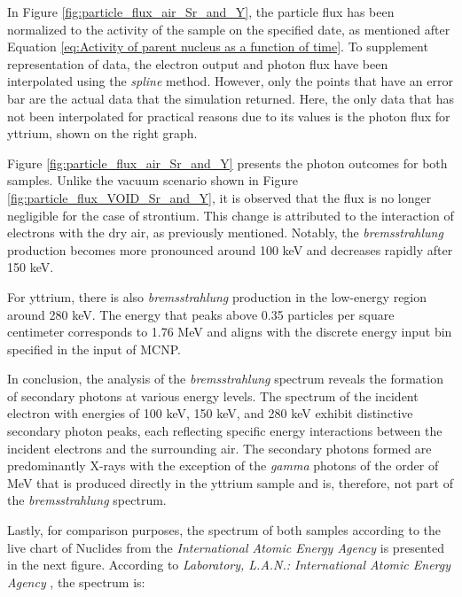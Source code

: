 In Figure \ref{fig:particle_flux_air_Sr_and_Y}, the particle flux has been normalized to the activity of the sample on the specified date, as mentioned after Equation \ref{eq:Activity of parent nucleus as a function of time}. To supplement representation of data, the electron output and photon flux have been interpolated using the \emph{spline} method. However, only the points that have an error bar are the actual data that the simulation returned. Here, the only data that has not been interpolated for practical reasons due to its values is the photon flux for yttrium, shown on the right graph.

Figure \ref{fig:particle_flux_air_Sr_and_Y} presents the photon outcomes for both samples. Unlike the vacuum scenario shown in Figure \ref{fig:particle_flux_VOID_Sr_and_Y}, it is observed that the flux is no longer negligible for the case of strontium. This change is attributed to the interaction of electrons with the dry air, as previously mentioned. Notably, the \emph{bremsstrahlung} production becomes more pronounced around 100 \unit{\kilo\electronvolt} and decreases rapidly after 150 \unit{\kilo\electronvolt}.

For yttrium, there is also \emph{bremsstrahlung} production in the low-energy region around 280 \unit{\kilo\electronvolt}. The energy that peaks above 0.35 particles per square centimeter corresponds to 1.76 \unit{\mega\electronvolt} and aligns with the discrete energy input bin specified in the input of MCNP.

In conclusion, the analysis of the \emph{bremsstrahlung} spectrum reveals the formation of secondary photons at various energy levels. The spectrum of the incident electron with energies of 100 \unit{\kilo\electronvolt}, 150 \unit{\kilo\electronvolt}, and 280 \unit{\kilo\electronvolt} exhibit distinctive secondary photon peaks, each reflecting specific energy interactions between the incident electrons and the surrounding air. The secondary photons formed are predominantly X-rays with the exception of the \emph{gamma} photons of the order of \unit{\mega\electronvolt} that is produced directly in the yttrium sample and is, therefore, not part of the \emph{bremsstrahlung} spectrum.

Lastly, for comparison purposes, the spectrum of both samples according to the live chart of Nuclides from the \emph{International Atomic Energy Agency} is presented in the next figure. According to \textit{Laboratory, L.A.N.: International Atomic Energy Agency} \cite{intlAtomicEnergy}, the spectrum is:

